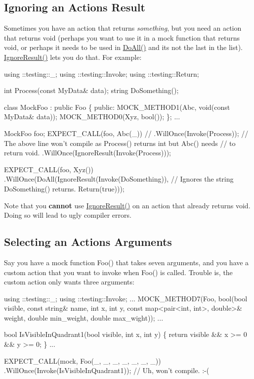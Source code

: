 \subsection*{Ignoring an Action\textquotesingle{}s Result}

Sometimes you have an action that returns {\itshape something}, but you need an action that returns {\ttfamily void} (perhaps you want to use it in a mock function that returns {\ttfamily void}, or perhaps it needs to be used in {\ttfamily \hyperlink{namespacetesting_a5f533932753d2af95000e96c4a3042e3}{Do\+All()}} and it\textquotesingle{}s not the last in the list). {\ttfamily \hyperlink{namespacetesting_a50ae42540a31047c7fddd32df8d835f5}{Ignore\+Result()}} lets you do that. For example\+:


\begin{DoxyCode}
using ::testing::\_;
using ::testing::Invoke;
using ::testing::Return;

int Process(const MyData& data);
string DoSomething();

class MockFoo : public Foo \{
 public:
  MOCK\_METHOD1(Abc, void(const MyData& data));
  MOCK\_METHOD0(Xyz, bool());
\};
...

  MockFoo foo;
  EXPECT\_CALL(foo, Abc(\_))
  // .WillOnce(Invoke(Process));
  // The above line won't compile as Process() returns int but Abc() needs
  // to return void.
      .WillOnce(IgnoreResult(Invoke(Process)));

  EXPECT\_CALL(foo, Xyz())
      .WillOnce(DoAll(IgnoreResult(Invoke(DoSomething)),
      // Ignores the string DoSomething() returns.
                      Return(true)));
\end{DoxyCode}


Note that you {\bfseries cannot} use {\ttfamily \hyperlink{namespacetesting_a50ae42540a31047c7fddd32df8d835f5}{Ignore\+Result()}} on an action that already returns {\ttfamily void}. Doing so will lead to ugly compiler errors.

\subsection*{Selecting an Action\textquotesingle{}s Arguments}

Say you have a mock function {\ttfamily Foo()} that takes seven arguments, and you have a custom action that you want to invoke when {\ttfamily Foo()} is called. Trouble is, the custom action only wants three arguments\+:


\begin{DoxyCode}
using ::testing::\_;
using ::testing::Invoke;
...
  MOCK\_METHOD7(Foo, bool(bool visible, const string& name, int x, int y,
                         const map<pair<int, int>, double>& weight,
                         double min\_weight, double max\_wight));
...

bool IsVisibleInQuadrant1(bool visible, int x, int y) \{
  return visible && x >= 0 && y >= 0;
\}
...

  EXPECT\_CALL(mock, Foo(\_, \_, \_, \_, \_, \_, \_))
      .WillOnce(Invoke(IsVisibleInQuadrant1));  // Uh, won't compile. :-(
\end{DoxyCode}


